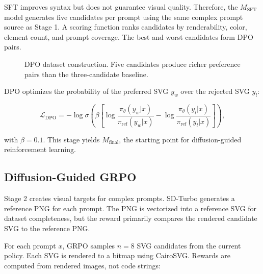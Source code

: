 \documentclass[10pt,twocolumn]{article}
\newcommand{\pith}{\pi_{\theta}}
\newcommand{\piref}{\pi_{\mathrm{ref}}}
\begin{document}
SFT improves syntax but does not guarantee visual quality. Therefore, the
\(M_{\mathrm{SFT}}\) model generates five candidates per prompt using the same
complex prompt source as Stage 1. A scoring function ranks candidates by
renderability, color, element count, and prompt coverage. The best and worst
candidates form DPO pairs.

\begin{figure}[t]
\centering
{}
\caption{DPO dataset construction. Five candidates produce richer preference
pairs than the three-candidate baseline.}
\label{fig:dpo}
\end{figure}

DPO optimizes the probability of the preferred SVG \(y_w\) over the rejected
SVG \(y_l\):

\begin{equation}
\mathcal{L}_{\mathrm{DPO}} =
-\log \sigma\left(
\beta
\left[
\log\frac{\pith(y_w|x)}{\piref(y_w|x)}
-
\log\frac{\pith(y_l|x)}{\piref(y_l|x)}
\right]
\right),
\end{equation}

with \(\beta=0.1\). This stage yields \(M_{\mathrm{final}}\), the starting point
for diffusion-guided reinforcement learning.

\subsection{Diffusion-Guided GRPO}

Stage 2 creates visual targets for complex prompts. SD-Turbo generates a
reference PNG for each prompt. The PNG is vectorized into a reference SVG for
dataset completeness, but the reward primarily compares the rendered candidate
SVG to the reference PNG.

For each prompt \(x\), GRPO samples \(n=8\) SVG candidates from the current
policy. Each SVG is rendered to a bitmap using CairoSVG. Rewards are computed
from rendered images, not code strings:
\end{document}
